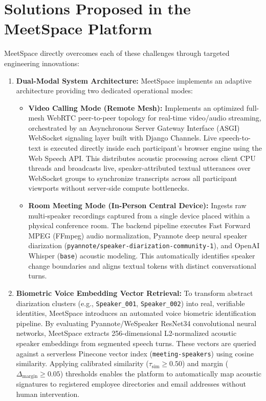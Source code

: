 \documentclass[12pt,oneside,letterpaper]{report}
\numberwithin{equation}{chapter} %
\begin{document}
\section{Solutions Proposed in the MeetSpace Platform}
MeetSpace directly overcomes each of these challenges through targeted engineering innovations:

\begin{enumerate}
    \item \textbf{Dual-Modal System Architecture:} MeetSpace implements an adaptive architecture providing two dedicated operational modes:
    \begin{itemize}
        \item \textbf{Video Calling Mode (Remote Mesh):} Implements an optimized full-mesh WebRTC peer-to-peer topology for real-time video/audio streaming, orchestrated by an Asynchronous Server Gateway Interface (ASGI) WebSocket signaling layer built with Django Channels. Live speech-to-text is executed directly inside each participant's browser engine using the Web Speech API. This distributes acoustic processing across client CPU threads and broadcasts live, speaker-attributed textual utterances over WebSocket groups to synchronize transcripts across all participant viewports without server-side compute bottlenecks.
        \item \textbf{Room Meeting Mode (In-Person Central Device):} Ingests raw multi-speaker recordings captured from a single device placed within a physical conference room. The backend pipeline executes Fast Forward MPEG (FFmpeg) audio normalization, Pyannote deep neural speaker diarization (\texttt{pyannote/speaker-diarization-community-1}), and OpenAI Whisper (\texttt{base}) acoustic modeling. This automatically identifies speaker change boundaries and aligns textual tokens with distinct conversational turns.
    \end{itemize}

    \item \textbf{Biometric Voice Embedding Vector Retrieval:} To transform abstract diarization clusters (e.g., \texttt{Speaker\_001}, \texttt{Speaker\_002}) into real, verifiable identities, MeetSpace introduces an automated voice biometric identification pipeline. By evaluating Pyannote/WeSpeaker ResNet34 convolutional neural networks, MeetSpace extracts 256-dimensional L2-normalized acoustic speaker embeddings from segmented speech turns. These vectors are queried against a serverless Pinecone vector index (\texttt{meeting-speakers}) using cosine similarity. Applying calibrated similarity ($\tau_{\text{sim}} \ge 0.50$) and margin ($\Delta_{\text{margin}} \ge 0.05$) thresholds enables the platform to automatically map acoustic signatures to registered employee directories and email addresses without human intervention.


\end{enumerate}
\end{document}
